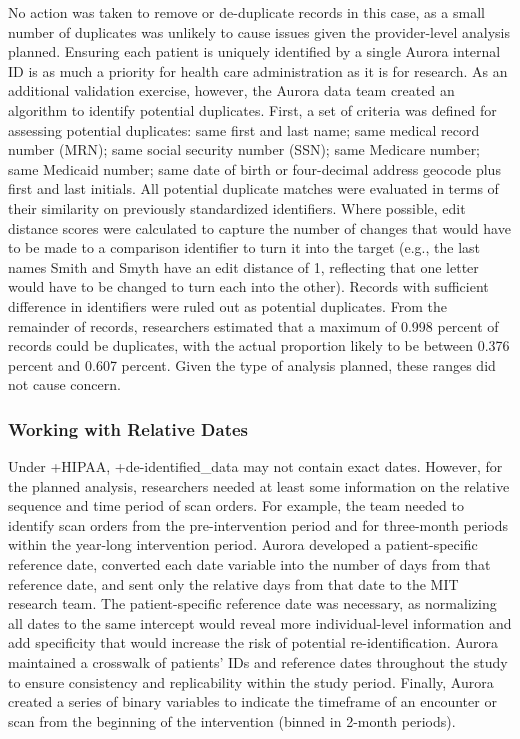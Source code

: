 \documentclass[
]{WileySix}
\begin{document}
No action was taken to remove or de-duplicate records in this case, as a small number of duplicates was unlikely to cause issues given the provider-level analysis planned. Ensuring each patient is uniquely identified by a single Aurora internal ID is as much a priority for health care administration as it is for research. As an additional validation exercise, however, the Aurora data team created an algorithm to identify potential duplicates. First, a set of criteria was defined for assessing potential duplicates: same first and last name; same medical record number (MRN); same social security number (SSN); same Medicare number; same Medicaid number; same date of birth or four-decimal address geocode plus first and last initials. All potential duplicate matches were evaluated in terms of their similarity on previously standardized identifiers. Where possible, edit distance scores were calculated to capture the number of changes that would have to be made to a comparison identifier to turn it into the target (e.g., the last names Smith and Smyth have an edit distance of 1, reflecting that one letter would have to be changed to turn each into the other). Records with sufficient difference in identifiers were ruled out as potential duplicates. From the remainder of records, researchers estimated that a maximum of 0.998 percent of records could be duplicates, with the actual proportion likely to be between 0.376 percent and 0.607 percent. Given the type of analysis planned, these ranges did not cause concern.

\hypertarget{working-with-relative-dates}{%
\subsubsection{Working with Relative Dates}\label{working-with-relative-dates}}

Under +HIPAA\textbar, +de-identified\_data\textbar{} may not contain exact dates. However, for the planned analysis, researchers needed at least some information on the relative sequence and time period of scan orders. For example, the team needed to identify scan orders from the pre-intervention period and for three-month periods within the year-long intervention period. Aurora developed a patient-specific reference date, converted each date variable into the number of days from that reference date, and sent only the relative days from that date to the MIT research team. The patient-specific reference date was necessary, as normalizing all dates to the same intercept would reveal more individual-level information and add specificity that would increase the risk of potential re-identification. Aurora maintained a crosswalk of patients' IDs and reference dates throughout the study to ensure consistency and replicability within the study period. Finally, Aurora created a series of binary variables to indicate the timeframe of an encounter or scan from the beginning of the intervention (binned in 2-month periods).
\end{document}
